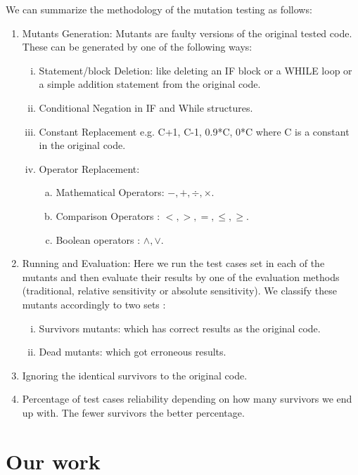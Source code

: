 \documentclass{acm_proc_article-sp}
\begin{document}
We can summarize the methodology of the mutation testing as follows:
\begin{enumerate}

\item Mutants Generation:
Mutants are faulty versions of the original tested code. These can be generated by one of the following ways:

\begin{enumerate}[i)]
\item Statement/block Deletion: like deleting an IF block or a WHILE loop or a simple addition statement from the original code.
\item Conditional Negation in IF and While structures.
\item Constant Replacement e.g. C+1, C-1, 0.9*C, 0*C where C is a constant in the original code.
\item Operator Replacement:
\begin{enumerate}[a)]
\item Mathematical Operators: $- , + , \div, \times$.
\item Comparison Operators : $<, >, =, \leq, \geq $.
\item Boolean operators : $\wedge, \vee$. 
\end{enumerate}

\end{enumerate}

\item Running and Evaluation:
Here we run the test cases set in each of the mutants and then evaluate their results by one of the evaluation methods (traditional, relative sensitivity or absolute sensitivity). We classify these mutants accordingly to two sets :
\begin{enumerate}[i)]
\item Survivors mutants: which has correct results as the original code. 
\item Dead mutants: which got erroneous results.
\end{enumerate}

\item Ignoring the identical survivors to the original code.

\item Percentage of test cases reliability depending on how many survivors we end up with. The fewer survivors the better percentage. 

\end{enumerate}

\section{Our work}
\end{document}
